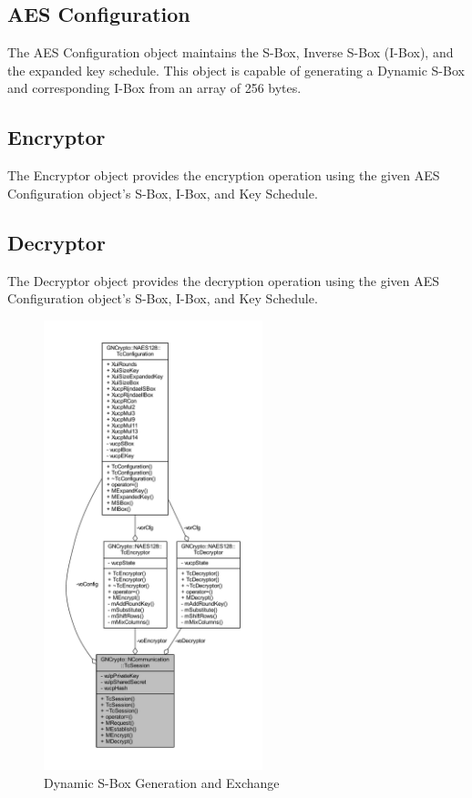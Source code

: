 \documentclass[journal]{IEEEtran}
\begin{document}
\subsection{AES Configuration}
The AES Configuration object maintains the S-Box, Inverse S-Box (I-Box), and the expanded key schedule. This object is capable of generating a Dynamic S-Box and corresponding I-Box from an array of 256 bytes.

\subsection{Encryptor}
The Encryptor object provides the encryption operation using the given AES Configuration object's S-Box, I-Box, and Key Schedule.

\subsection{Decryptor}
The Decryptor object provides the decryption operation using the given AES Configuration object's S-Box, I-Box, and Key Schedule.

\begin{figure}[!t]
	\centering
	\includegraphics[width=2.5in]{CollaborationSession}
	\caption{Dynamic S-Box Generation and Exchange}
	\label{Figure:CollaborationSession}
\end{figure}
\end{document}
